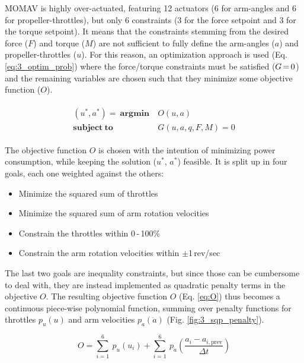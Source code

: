 \documentclass[conference]{IEEEtran}
\newcommand{\mcomp}{\thinmuskip=3mu\medmuskip=3mu\thickmuskip=3mu}
\begin{document}
\vspace{10pt}\par
MOMAV is highly over-actuated, featuring 12 actuators (6 for arm-angles and 6 for propeller-throttles), but only 6 constraints (3 for the force setpoint and 3 for the torque setpoint). It means that the constraints stemming from the desired force ($F$) and torque ($M$) are not sufficient to fully define the arm-angles ($a$) and propeller-throttles ($u$). For this reason, an optimization approach is used (Eq. \ref{eq:3_optim_prob}) where the force/torque constraints must be satisfied ($\mcomp G=0$) and the remaining variables are chosen such that they minimize some objective function ($O$).
\par
\begin{align}
	\begin{aligned}
		(u^*,a^*) = \ \mathrm{\mathbf{argmin}} \ &O(u,a) \\
		\mathrm{\mathbf{subject\ to}} \ &G(u,a,q,F,M)=0
	\end{aligned}
	\label{eq:3_optim_prob}
\end{align}
\vspace{0pt}\par
\vspace{6pt}\par
The objective function $O$ is chosen with the intention of minimizing power consumption, while keeping the solution ($u^*$, $a^*$) feasible. It is split up in four goals, each one weighted against the others:
\begin{itemize}
	\vspace{4pt}
	\item Minimize the squared sum of throttles
	\item Minimize the squared sum of arm rotation velocities
	\item Constrain the throttles within 0\,-\,100\%
	\item Constrain the arm rotation velocities within $\pm$1\,rev/sec
	\vspace{8pt}
\end{itemize}
The last two goals are inequality constraints, but since those can be cumbersome to deal with, they are instead implemented as quadratic penalty terms in the objective $O$. The resulting objective function $O$ (Eq. \ref{eq:O}) thus becomes a continuous piece-wise polynomial function, summing over penalty functions for throttles $p_u(u)$ and arm velocities $p_{\dot{a}}(\dot{a})$ (Fig. \ref{fig:3_sqp_penalty}).
\par
\begin{equation}
	O = \sum_{i=1}^{6} \ p_u(u_i) + \sum_{i=1}^{6} \ p_{\dot{a}}\left(\frac{a_i-a_{i,\mathrm{prev}}}{\Delta t}\right)
	\label{eq:O}
\end{equation}
\end{document}
